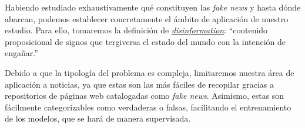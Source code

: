 Habiendo estudiado exhaustivamente qué constituyen las \emph{fake news} y hasta dónde abarcan, podemos establecer concretamente el ámbito de aplicación de nuestro estudio. Para ello, tomaremos la definición de \emph{\underline{disinformation}}: ``contenido proposicional de signos que tergiversa el estado del mundo con la intención de engañar.''

Debido a que la tipología del problema es compleja, limitaremos nuestra área de aplicación a noticias, ya que estas son las más fáciles de recopilar gracias a repositorios de páginas web catalogadas como \emph{fake news}. Asimismo, estas son fácilmente categorizables como verdaderas o falsas, facilitando el entrenamiento de los modelos, que se hará de manera supervisada.